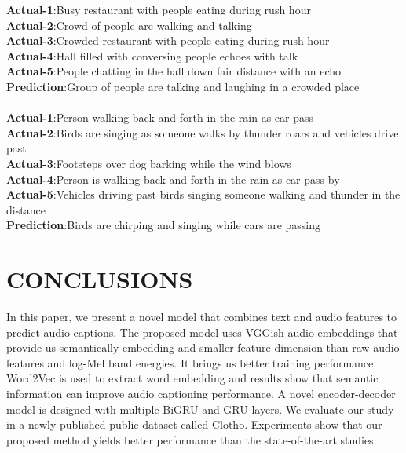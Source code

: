 \documentclass{article}
\begin{document}
\noindent\textbf{Actual-1}:{\selectfont Busy restaurant with people eating during rush hour}\\
\textbf{Actual-2}:{\selectfont Crowd of people are walking and talking} \\
\textbf{Actual-3}:{\selectfont Crowded restaurant with people eating during rush hour} \\
\textbf{Actual-4}:{\selectfont Hall filled with conversing people echoes with talk} \\
\textbf{Actual-5}:{\selectfont People chatting in the hall down fair distance with an echo} \\
\textbf{Prediction}:{\selectfont Group of people are talking and laughing in a crowded place} \\
\\
\textbf{Actual-1}:{\selectfont Person walking back and forth in the rain as car pass} \\
\textbf{Actual-2}:{\selectfont Birds are singing as someone walks by thunder roars and vehicles drive past} \\
\textbf{Actual-3}:{\selectfont Footsteps over dog barking while the wind blows} \\
\textbf{Actual-4}:{\selectfont Person is walking back and forth in the rain as car pass by} \\
\textbf{Actual-5}:{\selectfont Vehicles driving past birds singing someone walking and thunder in the distance}\\ 
\textbf{Prediction}:{\selectfont Birds are chirping and singing while cars are passing}
\section{CONCLUSIONS}
In this paper, we present a novel model that combines text and audio features to predict audio captions. The proposed model uses VGGish audio embeddings that provide us semantically embedding and smaller feature dimension than raw audio features and log-Mel band energies. It brings us better training performance. Word2Vec is used to extract word embedding and results show that semantic information can improve audio captioning performance. A novel encoder-decoder model is designed with multiple BiGRU and GRU layers. We evaluate our study in a newly published public dataset called Clotho. Experiments show that our proposed method yields better performance than the state-of-the-art studies. 
\end{document}
